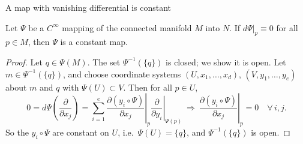 \documentclass[10pt]{beamer}
\begin{document}
\begin{frame}{A map with vanishing differential is constant}
	\begin{theorem}
		Let $\Psi$ be a $C^\infty$ mapping of the connected manifold $M$
		into $N$. If $d\Psi|_p \equiv 0$ for all $p \in M$, then $\Psi$ is
		a constant map.
	\end{theorem}
	\begin{proof}
		Let $q \in \Psi(M)$. The set $\Psi^{-1}(\{q\})$ is closed; we show
		it is open. Let $m \in \Psi^{-1}(\{q\})$, and choose coordinate
		systems $(U, x_1, \dots, x_d)$, $(V, y_1, \dots, y_e)$ about $m$
		and $q$ with $\Psi(U) \subset V$. Then for all $p \in U$,
		\[
			0 = d\Psi\left( \frac{\partial}{\partial x_j} \right)
			= \sum_{i=1}^{e} \left. \frac{\partial (y_i \circ \Psi)}
			{\partial x_j} \right|_{p}
			\left. \frac{\partial}{\partial y_i} \right|_{\Psi(p)}
			\ \Longrightarrow\
			\left. \frac{\partial (y_i \circ \Psi)}{\partial x_j}
			\right|_{p} = 0 \quad \forall\, i, j.
		\]
		So the $y_i \circ \Psi$ are constant on $U$, i.e.\ $\Psi(U) = \{q\}$,
		and $\Psi^{-1}(\{q\})$ is open. \qedhere
	\end{proof}
\end{frame}
\end{document}
